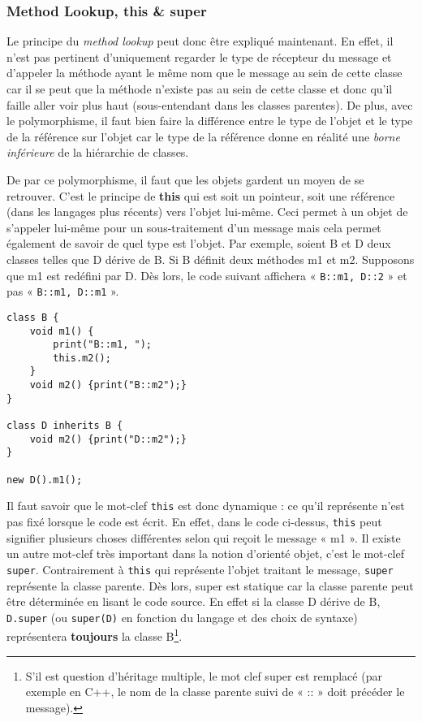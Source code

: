 \documentclass{article}
\begin{document}
		\subsubsection{Method Lookup, this \& super}
			Le principe du \textit{method lookup} peut donc être expliqué maintenant. En effet, il n'est pas pertinent d'uniquement regarder le type de récepteur du message et d'appeler
			la méthode ayant le même nom que le message au sein de cette classe car il se peut que la méthode n'existe pas au sein de cette classe et donc qu'il faille aller voir plus haut
			(sous-entendant dans les classes parentes). De plus, avec le polymorphisme, il faut bien faire la différence entre le type de l'objet et le type de la référence sur l'objet
			car le type de la référence donne en réalité une \textit{borne inférieure} de la hiérarchie de classes.

			De par ce polymorphisme, il faut que les objets gardent un moyen de se retrouver. C'est le principe de \textbf{this} qui est soit un pointeur, soit une référence (dans les langages
			plus récents) vers l'objet lui-même. Ceci permet à un objet de s'appeler lui-même pour un sous-traitement d'un message mais cela permet également de savoir de quel type est l'objet.
			Par exemple, soient B et D deux classes telles que D dérive de B. Si B définit deux méthodes m1 et m2. Supposons que m1 est redéfini par D. Dès lors, le code suivant affichera
			« \texttt{B::m1, D::2} » et pas « \texttt{B::m1, D::m1} ».

\begin{verbatim}
class B {
    void m1() {
        print("B::m1, ");
        this.m2();
    }
    void m2() {print("B::m2");}
}

class D inherits B {
    void m2() {print("D::m2");}
}

new D().m1();
\end{verbatim}
			
			Il faut savoir que le mot-clef \texttt{this} est donc dynamique : ce qu'il représente n'est pas fixé lorsque le code est écrit. En effet, dans le code ci-dessus, \texttt{this} peut
			signifier plusieurs choses différentes selon qui reçoit le message « m1 ». Il existe un autre mot-clef très important dans la notion d'orienté objet, c'est le mot-clef \texttt{super}.
			Contrairement à \texttt{this} qui représente l'objet traitant le message, \texttt{super} représente la classe parente. Dès lors, super est statique car la classe parente peut être
			déterminée en lisant le code source. En effet si la classe D dérive de B, \texttt{D.super} (ou \texttt{super(D)} en fonction du langage et des choix de syntaxe) représentera
			\textbf{toujours} la classe B\footnote{S'il est question d'héritage multiple, le mot clef super est remplacé (par exemple en C++, le nom de la classe parente suivi de « :: » doit
			précéder le message).}.
\end{document}
